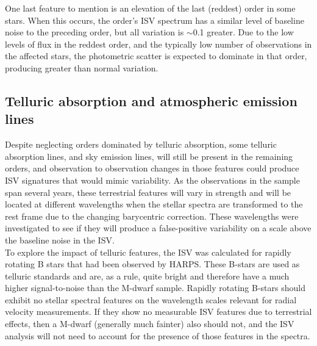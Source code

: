 One last feature to mention is an elevation of the last (reddest) order in some stars. When this occurs, the order's ISV spectrum has a similar level of baseline noise to the preceding order, but all variation is $\sim$0.1 greater. Due to the low levels of flux in the reddest order, and the typically low number of observations in the affected stars, the photometric scatter is expected to dominate in that order, producing greater than normal variation.

\subsection{Telluric absorption and atmospheric emission lines}
\label{secNonStellarLines}
Despite neglecting orders dominated by telluric absorption, some telluric  absorption lines, and sky emission lines, will still be present in the remaining orders, and observation to observation changes in those features could produce ISV signatures that would mimic variability. As the observations in the sample span several years, these terrestrial features will vary in strength and will be located at different wavelengths when the stellar spectra are transformed to the rest frame due to the changing barycentric correction. These wavelengths were investigated to see if they will produce a false-positive variability on a scale above the baseline noise in the ISV.\\

To explore the impact of telluric features, the ISV was calculated for rapidly rotating B stars that had been observed by HARPS. These B-stars are used as telluric standards and are, as a rule, quite bright and therefore have a much higher signal-to-noise than the M-dwarf sample. Rapidly rotating B-stars should exhibit no stellar spectral features on the wavelength scales relevant for radial velocity measurements. If they show no measurable ISV features due to terrestrial effects, then a M-dwarf (generally much fainter) also should not, and the ISV analysis will not need to account for the presence of those features in the spectra.\\

